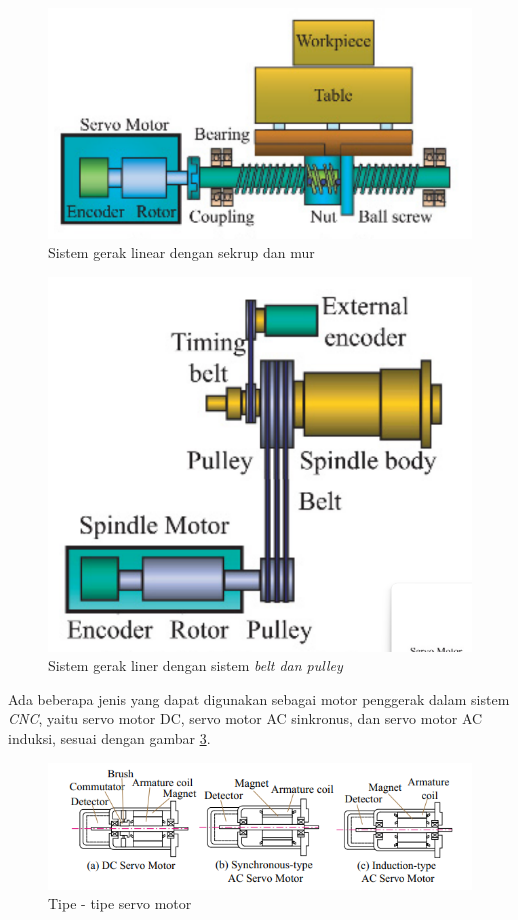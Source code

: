\begin{figure}[H]
    \centering
    \includegraphics[width=0.5\linewidth]{gambar/nut-screw-mech.png}
    \caption{Sistem gerak linear dengan sekrup dan mur}
    \label{fig:nut-screw}
\end{figure}

\begin{figure}[H]
    \centering
    \includegraphics[width=0.4\linewidth]{gambar/pully-mech.png}
    \caption{Sistem gerak liner dengan sistem \textit{belt dan pulley}}
    \label{fig:pulley}
\end{figure}

Ada beberapa jenis yang dapat digunakan sebagai motor penggerak dalam sistem \textit{CNC}, yaitu servo motor DC, servo motor AC sinkronus, dan servo motor AC induksi, sesuai dengan gambar \ref{fig:servo-types}.

\begin{figure}[H]
    \centering
    \includegraphics[width=0.8\linewidth]{gambar/servo-motor-diff.png}
    \caption{Tipe - tipe servo motor}
    \label{fig:servo-types}
\end{figure}

